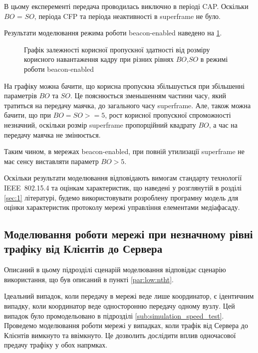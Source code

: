 \documentclass[a4paper,ukrainian,utf8,nocolumnsxix,floatsection,equationsection]{eskdtext}
\newcommand{\longcaption}[1]{\captionsetup{style=figureLongCaption}\caption{#1}}
\newcommand{\iee}[0]{IEEE~802.15.4\xspace}
\newcommand{\bem}[0]{beacon-enabled\xspace}
\begin{document}
В цьому експеременті передача проводилась виключно в періоді CAP. Оскільки $BO$ = $SO$, періода CFP та періода неактивності в superframe не було.

Результати моделювання режима роботи \bem наведено на \cref{fig:result_tp_beacon}.

\begin{figure}[htbp]
	\centering
	\longcaption{\label{fig:result_tp_beacon}Графік залежності корисної пропускної здатності від розміру корисного навантаження кадру при різних рівнях $BO$,$SO$ в режимі роботи \bem}
\end{figure}

На графіку можна бачити, що корисна пропускна збільшується при збільшенні параметрів $BO$ та $SO$. Це пояснюється зменьшенням частини часу, який тратиться на передачу маячка, до загального часу superframe. Але, також можна бачити, що при $BO=SO>=5$, рост корисної пропускної спроможності незначний, оскільки розмір superframe пропорційний квадрату $BO$, а час на передачу маячка не змінюється.

Таким чином, в мережах \bem, при повній утилизації superframe не має сенсу виставляти параметр $BO>5$. 

Оскільки результати моделювання відповідають вимогам стандарту технології \iee та оцінкам характеристик, що наведені у розглянутій в розділі \ref{sec:1} літературі, будемо використовувати розроблену програмну модель для оцінки характеристик протоколу мережі управління елементами медіафасаду.

\subsection{Моделювання роботи мережі при незначному рівні трафіку від Клієнтів до Сервера}
\label{sub:simulation_backtraf_nobeac}

Описаний в цьому підрозділі сценарій моделювання відповідає сценарію використання, що був описаний в пункті \ref{par:low:ntht}.

Ідеальний випадок, коли передачу в мережі веде лише координатор, є ідентичним випадку, коли координатор веде односторонню передачу одному вузлу. Цей випадок було промодельовано в підрозділі \ref{sub:simulation_speed_test}. Проведемо моделювання роботи мережі у випадках, коли трафік від Сервера до Клієнтів вимкнуто та ввімкнуто. Це дозволить дослідити вплив одночасової предачу трафіку у обох напрмках.
\end{document}
